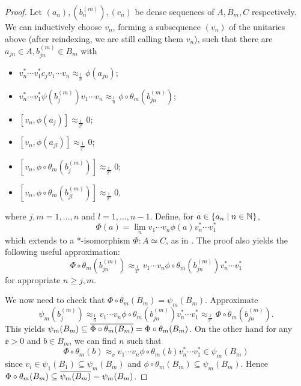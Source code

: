 \documentclass[12pt]{amsart}
\begin{document}
\begin{prop}
\begin{proof}
              Let $(a_n),(b_n^{(m)}),(c_n)$ be dense sequences of $A,B_m,C$ respectively. We can inductively choose $v_n$, forming a subsequence $(v_n)$ of the unitaries above (after reindexing, we are still calling them $v_n$), such that there are $a_{jn} \in A, b_{jn}^{(m)} \in B_m$ with
                \begin{itemize}
                  \item $v_n^*\cdots v_1^*c_jv_1\cdots v_n \approx_{\frac{1}{n}} \phi(a_{jn})$;
                  \item $v_n^*\cdots v_1^*\psi(b_j^{(m)})v_1\cdots v_n \approx_{\frac{1}{n}} \phi \circ \theta_m(b_{jn}^{(m)})$;
                  \item $[v_n,\phi(a_j)] \approx_{\frac{1}{2^n}} 0$;
                  \item $[v_n,\phi(a_{jl})] \approx_{\frac{1}{2^n}} 0$;
                  \item $[v_n,\phi \circ \theta_m(b_j^{(m)})] \approx_{\frac{1}{2^n}} 0$;
                \item $[v_n,\phi \circ \theta_m(b_{jl}^{(m)})] \approx_{\frac{1}{2^n}} 0$,
                \end{itemize}
                where $j,m=1,\dots,n$ and $l=1,\dots,n-1$. Define, for $a \in \{a_n \mid n \in \mathbb{N}\}$,
\begin{equation}
                \Phi(a) = \lim_n v_1\cdots v_n\phi(a) v_n^*\cdots v_1^*
\end{equation}
                which extends to a *-isomorphism $\Phi: A \simeq C$, as in \cite[Proposition 2.3.5]{RordamBook}. The proof also yields the following useful approximation:
\begin{equation}
                \Phi \circ \theta_m(b_{jn}^{(m)}) \approx_{\frac{1}{2^n}} v_1 \cdots v_n \phi \circ \theta_m(b_{jn}^{(m)})v_n^* \cdots v_1^*
\end{equation}
                for appropriate $n \geq j,m$. 

                We now need to check that $\Phi \circ \theta_m(B_m) = \psi_m(B_m)$. Approximate
\begin{equation}
                 \psi_m(b_j^{(m)}) \approx_{\frac{1}{n}} v_1\cdots v_n \phi \circ \theta_m(b_{jn}^{(m)})v_n^*\cdots v_1^* \approx_{\frac{1}{2^n}} \Phi \circ \theta_m(b_{jn}^{(m)}).
\end{equation}
                This yields $\psi_m(B_m) \subseteq \overline{\Phi \circ \theta_m(B_m)} = \Phi \circ \theta_m(B_m)$. On the other hand for any $\ee > 0$ and $b \in B_m$, we can find $n$ such that
\begin{equation}
                \Phi \circ \theta_m(b) \approx_\ee v_1\cdots v_n \phi \circ \theta_m(b)v_n^*\cdots v_1^* \in \psi_m(B_m)
\end{equation}
                since $v_i \in \psi_1(B_1) \subseteq \psi_m(B_m)$ and $\phi \circ \theta_m(B_m) \subseteq \psi_m(B_m)$. Hence $\Phi \circ \theta_m(B_m) \subseteq \overline{\psi_m(B_m)} = \psi_m(B_m)$. 
            \end{proof}
      \end{prop}
\end{document}
